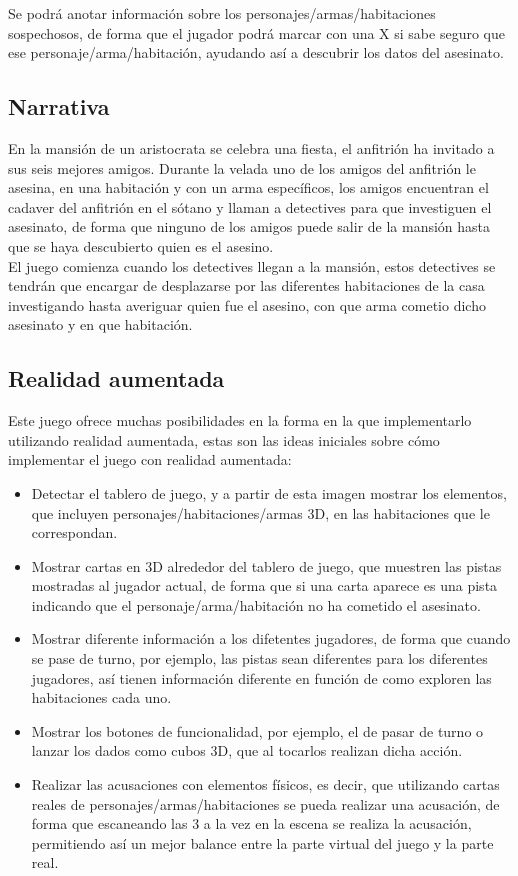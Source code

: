 Se podrá anotar información sobre los personajes/armas/habitaciones sospechosos, de forma que el jugador podrá marcar con una X si sabe seguro que ese personaje/arma/habitación, ayudando así a descubrir los datos del asesinato.

\subsection{Narrativa}
En la mansión de un aristocrata se celebra una fiesta, el anfitrión ha invitado a sus seis mejores amigos. Durante la velada uno de los amigos del anfitrión le asesina, en una habitación y con un arma específicos, los amigos encuentran el cadaver del anfitrión en el sótano y llaman a detectives para que investiguen el asesinato, de forma que ninguno de los amigos puede salir de la mansión hasta que se haya descubierto quien es el asesino.\\

El juego comienza cuando los detectives llegan a la mansión, estos detectives se tendrán que encargar de desplazarse por las diferentes habitaciones de la casa investigando hasta averiguar quien fue el asesino, con que arma cometio dicho asesinato y en que habitación.

\subsection{Realidad aumentada}
Este juego ofrece muchas posibilidades en la forma en la que implementarlo utilizando realidad aumentada, estas son las ideas iniciales sobre cómo implementar el juego con realidad aumentada:

\begin{itemize}
  \item Detectar el tablero de juego, y a partir de esta imagen mostrar los elementos, que incluyen personajes/habitaciones/armas 3D, en las habitaciones que le correspondan.
  \item Mostrar cartas en 3D alrededor del tablero de juego, que muestren las pistas mostradas al jugador actual, de forma que si una carta aparece es una pista indicando que el personaje/arma/habitación no ha cometido el asesinato.
  \item Mostrar diferente información a los difetentes jugadores, de forma que cuando se pase de turno, por ejemplo, las pistas sean diferentes para los diferentes jugadores, así tienen información diferente en función de como exploren las habitaciones cada uno.
  \item Mostrar los botones de funcionalidad, por ejemplo, el de pasar de turno o lanzar los dados como cubos 3D, que al tocarlos realizan dicha acción.
  \item Realizar las acusaciones con elementos físicos, es decir, que utilizando cartas reales de personajes/armas/habitaciones se pueda realizar una acusación, de forma que escaneando las 3 a la vez en la escena se realiza la acusación, permitiendo así un mejor balance entre la parte virtual del juego y la parte real.
\end{itemize}
